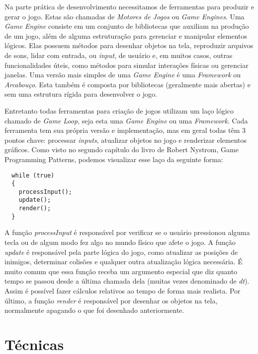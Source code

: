 Na parte prática de desenvolvimento necessitamos de ferramentas para produzir e gerar o jogo. Estas são chamadas de \textit{Motores de Jogos} ou \textit{Game Engines}. Uma \textit{Game Engine} consiste em um conjunto de bibliotecas que auxiliam na produção de um jogo, além de alguma estruturação para gerenciar e manipular elementos lógicos. Elas possuem métodos para desenhar objetos na tela, reproduzir arquivos de sons, lidar com entrada, ou \textit{input}, de usuário e, em muitos casos, outras funcionalidades úteis, como métodos para simular interações físicas ou gerenciar janelas. Uma versão mais simples de uma \textit{Game Engine} é uma \textit{Framework} ou \textit{Arcabouço}. Esta também é composta por bibliotecas (geralmente mais abertas) e sem uma estrutura rígida para desenvolver o jogo.

Entretanto todas ferramentas para criação de jogos utilizam um laço lógico chamado de \textit{Game Loop}, seja esta uma \textit{Game Engine} ou uma \textit{Framework}. Cada ferramenta tem sua própria versão e implementação, mas em geral todas têm 3 pontos chave: processar \textit{inputs}, atualizar objetos no jogo e renderizar elementos gráficos. Como visto no segundo capítulo do livro de Robert Nystrom, Game Programming Patterns\cite{robertgameloop}, podemos visualizar esse laço da seguinte forma:

\begin{lstlisting}
  while (true)
  {
    processInput();
    update();
    render();
  }
\end{lstlisting}

A função \textit{processInput} é responsável por verificar se o usuário pressionou alguma tecla ou de algum modo fez algo no mundo físico que afete o jogo. A função \textit{update} é responsável pela parte lógica do jogo, como atualizar as posições de inimigos, determinar colisões e qualquer outra atualização lógica necessária. É muito comum que essa função receba um argumento especial que diz quanto tempo se passou desde a última chamada dela (muitas vezes denominado de \textit{dt}). Assim é possível fazer cálculos relativos ao tempo de forma mais realista. Por último, a função \textit{render} é responsável por desenhar os objetos na tela, normalmente apagando o que foi desenhado anteriormente.


\section{Técnicas}
\label{sec:tecnicas}

